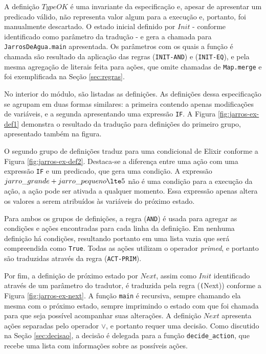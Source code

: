 A definição $TypeOK$ é uma invariante da especificação e, apesar de apresentar
um predicado válido, não representa valor algum para a execução e, portanto, foi
manualmente descartado. O estado inicial definido por $Init$ - conforme identificado como
parâmetro da tradução - e gera a chamada para \texttt{JarrosDeAgua.main}
apresentada. Os parâmetros com os quais a função é chamada são resultado da
aplicação das regras (\texttt{INIT-AND}) e (\texttt{INIT-EQ}), e pela mesma
agregação de literais feita para ações, que omite chamadas de \texttt{Map.merge}
e foi exemplificada na Seção \ref{sec:regras}.

No interior do módulo, são listadas as definições. As definições dessa
especificação se agrupam em duas formas similares: a primeira contendo apenas
modificações de variáveis, e a segunda apresentando uma expressão \texttt{IF}. A
Figura \ref{fig:jarros-ex-def1} demonstra o resultado da tradução para
definições do primeiro grupo, apresentado também na figura.

O segundo grupo de definições traduz para uma condicional de Elixir conforme a
Figura \ref{fig:jarros-ex-def2}. Destaca-se a diferença entre uma ação com uma
expressão \texttt{IF} e um predicado, que gera uma condição. A expressão
$jarro\_grande + jarro\_pequeno \lte 5$ não é uma condição para a execução da
ação, a ação pode ser ativada a qualquer momento. Essa expressão apenas altera
os valores a serem atribuídos às variáveis do próximo estado.

Para ambos os grupos de definições, a regra (\texttt{AND}) é usada para agregar
as condições e ações encontradas para cada linha da definição. Em nenhuma
definição há condições, resultando portanto em uma lista vazia que será
compreendida como \texttt{True}. Todas as ações utilizam o operador
\textit{primed}, e portanto são traduzidas através da regra (\texttt{ACT-PRIM}).

Por fim, a definição de próximo estado por $Next$, assim como $Init$ identificado através
de um parâmetro do tradutor, é traduzida pela regra (\texttt(Next)) conforme a
Figura \ref{fig:jarros-ex-next}. A função \texttt{main} é recursiva, sempre
chamando ela mesma com o próximo estado, sempre imprimindo o estado com que foi
chamada para que seja possível acompanhar suas alterações. A definição $Next$
apresenta ações separadas pelo operador $\lor$, e portanto requer uma decisão.
Como discutido na Seção \ref{sec:decisao}, a decisão é delegada para a função
\texttt{decide\_action}, que recebe uma lista com informações sobre as possíveis
ações.

